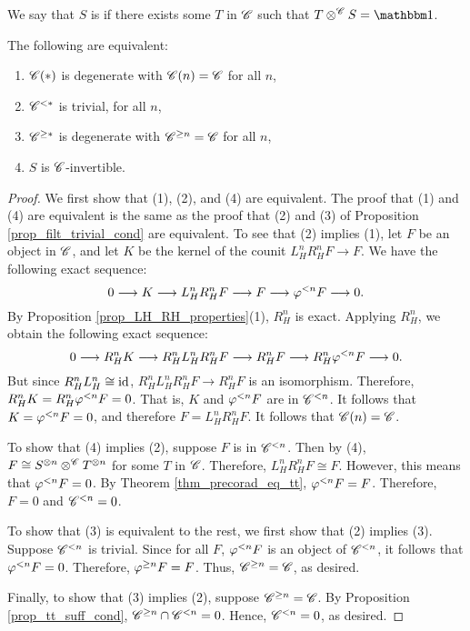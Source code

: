\begin{defn}
We say that $S$ is  if there exists some 
$T$ in $\Cat{C}$ such that $T \tensor^{\Cat{C}} S = \Unit$. 
\end{defn}

\begin{prop}\label{prop_torsion_filt_degen_cond}
The following are equivalent:
\begin{enumerate}
\item $\SGFilt{*}{\Cat{C}}$ is degenerate with $\SGFilt{n}{\Cat{C}} = 
\Cat{C}$ for all $n$,

\item $\Corad{*}{\Cat{C}}$ is trivial,
for all $n$,

\item $\Prerad{*}{\Cat{C}}$ is degenerate with $\Prerad{n}{\Cat{C}} = 
\Cat{C}$ for all $n$,

\item $S$ is $\Cat{C}$-invertible.
\end{enumerate}
\end{prop}
\begin{proof}
We first show that (1), (2), and (4) are equivalent. The proof 
that (1) and (4) are equivalent is the same as the proof that (2) 
and (3) of Proposition \ref{prop_filt_trivial_cond} are 
equivalent. To see that (2) implies (1), let $F$ be an object in 
$\Cat{C}$, and let $K$ be the kernel of the counit $L_H^n R_H^n F 
\to F$. We have the following exact sequence:
\[
0 \to K \to L_H^n R_H^n F \to F \to \corad{n} F \to 0.
\]
By Proposition \ref{prop_LH_RH_properties}(1), $R_H^n$ is exact. 
Applying $R_H^n$, we obtain the following exact sequence:
\[
0 \to R_H^n K \to R_H^n L_H^n R_H^n F \to R_H^n F \to R_H^n \corad{n} F \to 0.
\]
But since $R_H^n L_H^n \cong \id$, $R_H^n L_H^n R_H^n F \to R_H^n F$ is 
an isomorphism. Therefore, $R_H^n K = R_H^n \corad{n} F = 0$. That is,
$K$ and $\corad{n} F$ are in $\Corad{n}{\Cat{C}}$. It follows that
$K = \corad{n} F = 0$, and therefore $F = L_H^n R_H^n F$. It follows that
$\SGFilt{n}{\Cat{C}} = \Cat{C}$.

To show that (4) implies (2), suppose $F$ is in 
$\Corad{n}{\Cat{C}}$. Then by (4), $F \cong S^{\tensor n} 
\tensor^{\Cat{C}} T^{\tensor n}$ for some $T$ in $\Cat{C}$. Therefore,
$L_H^n R_H^n F \cong F$. However, this means that $\corad{n} F = 0$.
By Theorem \ref{thm_precorad_eq_tt}, $\corad{n} F = F$. Therefore,
$F = 0$ and $\Corad{n}{\Cat{C}} = 0$.

To show that (3) is equivalent to the rest, we first show that (2) 
implies (3). Suppose $\Corad{n}{\Cat{C}}$ is trivial. Since 
for all $F$, $\corad{n} F$ is an object of $\Corad{n}{\Cat{C}}$, it 
follows that $\corad{n}F = 0$. Therefore, $\prerad{n}F = F$. Thus, 
$\Prerad{n}{\Cat{C}} = \Cat{C}$, as desired.

Finally, to show that (3) implies (2), suppose 
$\Prerad{n}{\Cat{C}} = \Cat{C}$. By Proposition \ref{prop_tt_suff_cond}, 
$\Prerad{n}{\Cat{C}} \cap \Corad{n}{\Cat{C}} = 0$. Hence,
$\Corad{n}{\Cat{C}} = 0$, as desired.
\end{proof}


